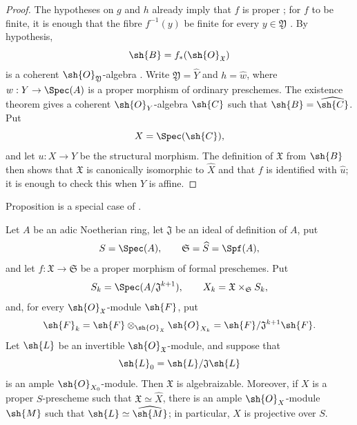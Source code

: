 \begin{proof}
The hypotheses on $g$ and $h$ already imply that $f$ is proper
; for $f$ to be finite, it is enough that the fibre
$f^{-1}(y)$ be finite for every $y\in\mathfrak{Y}$
.  By hypothesis,
\[
  \sh{B}=f_*(\sh{O}_{\mathfrak{X}})
\]
is a coherent $\sh{O}_{\mathfrak{Y}}$-algebra
.  Write
$\mathfrak{Y}=\widehat{Y}$ and $h=\widehat{w}$, where
$w:Y\to\Spec(A)$ is a proper morphism of ordinary preschemes.  The
existence theorem gives a coherent $\sh{O}_Y$-algebra $\sh{C}$
such that $\sh{B}=\widehat{\sh{C}}$.  Put
\[
  X=\Spec(\sh{C}),
\]
and let $u:X\to Y$ be the structural morphism.  The definition of
$\mathfrak{X}$ from $\sh{B}$  then shows that
$\mathfrak{X}$ is canonically isomorphic to $\widehat{X}$ and
that $f$ is identified with $\widehat{u}$; it is enough to check
this when $Y$ is affine.
\end{proof}

Proposition  is a special case of
.

\begin{theorem}[5.4.5]
\label{III.5.4.5}
Let $A$ be an adic Noetherian ring, let $\mathfrak{J}$ be an ideal
of definition of $A$, put
\[
  S=\Spec(A),\qquad
  \mathfrak{S}=\widehat{S}=\Spf(A),
\]
and let $f:\mathfrak{X}\to\mathfrak{S}$ be a proper morphism of
formal preschemes.  Put
\[
  S_k=\Spec(A/\mathfrak{J}^{k+1}),\qquad
  X_k=\mathfrak{X}\times_{\mathfrak{S}}S_k,
\]
and, for every $\sh{O}_{\mathfrak{X}}$-module $\sh{F}$, put
\[
  \sh{F}_k
  =\sh{F}\otimes_{\sh{O}_{\mathfrak{X}}}\sh{O}_{X_k}
  =\sh{F}/\mathfrak{J}^{k+1}\sh{F}.
\]
Let $\sh{L}$ be an invertible
$\sh{O}_{\mathfrak{X}}$-module, and suppose that
\[
  \sh{L}_0=\sh{L}/\mathfrak{J}\sh{L}
\]
is an ample $\sh{O}_{X_0}$-module.  Then $\mathfrak{X}$ is
algebraizable.  Moreover, if $X$ is a proper $S$-prescheme such
that $\mathfrak{X}\simeq\widehat{X}$, there is an ample
$\sh{O}_X$-module $\sh{M}$ such that
$\sh{L}\simeq\widehat{\sh{M}}$; in particular, $X$ is projective
over $S$.
\end{theorem}

